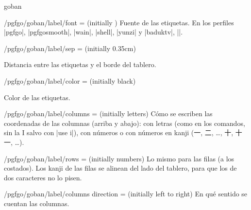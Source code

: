 \begin{environment}{{goban}}
\begin{key}{/pgfgo/goban/label/font =  (initially \texttt{\string\normalfont})}
		Fuente de las etiquetas. En los perfiles |pgfgo|, |pgfgosmooth|, |wain|, |shell|, |yunzi| y |baduktv|, |\sffamily|.

		\begin{codeexample}[]
			\begin{goban}[5, label = {at = {south, west}, font = \bfseries}]
			\end{goban}
		\end{codeexample}
	\end{key}
	
	\begin{key}{/pgfgo/goban/label/sep =  (initially 0.35cm)}
		
		Distancia entre las etiquetas y el borde del tablero.
	\end{key}
	
	\begin{key}{/pgfgo/goban/label/color =  (initially black)}
		
		Color de las etiquetas.

		\begin{codeexample}[]
			\begin{goban}[5, label = {at = {south, west}, color = red, sep = 0.6cm}]
			\end{goban}
		\end{codeexample}
	\end{key}

	\begin{key}{/pgfgo/goban/label/columns =  (initially letters)}
		Cómo se escriben las coordenadas de las columnas (arriba y abajo): con letras (como en los comandos, sin la I salvo con |use i|), con números o con números en kanji ({\pgfgokanji 一, 二, …, 十, 十一}, …).
	\end{key}

	\begin{key}{/pgfgo/goban/label/rows =  (initially numbers)}
		Lo mismo para las filas (a los costados). Los kanji de las filas se alinean del lado del tablero, para que los de dos caracteres no lo pisen.
	\end{key}

	\begin{key}{/pgfgo/goban/label/columns direction =  (initially left to right)}
		En qué sentido se cuentan las columnas.

		\begin{codeexample}[]
			\begin{goban}[5, label = {at = {north, east},
					columns direction = right to left, rows = letters}]
			\end{goban}
		\end{codeexample}
	\end{key}


\end{environment}
